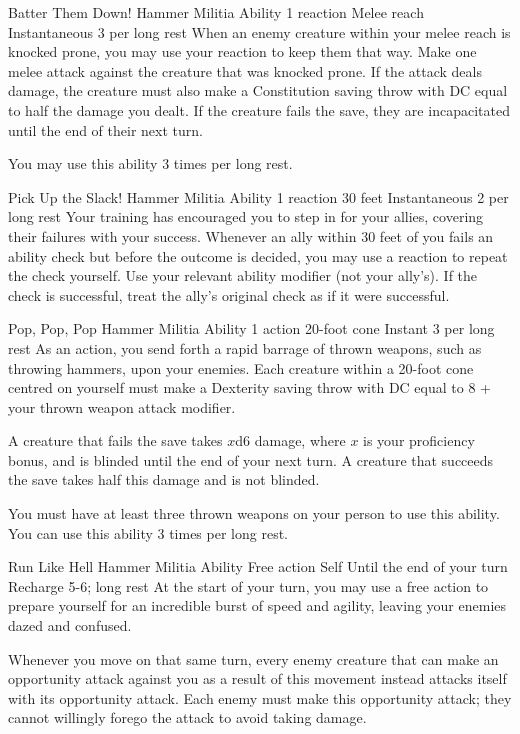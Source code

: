 \ability%
    {Batter Them Down!}
    {Hammer Militia Ability}
    {1 reaction}
    {Melee reach}
    {Instantaneous}
    {3 per long rest}
When an enemy creature within your melee reach is knocked prone,
you may use your reaction to keep them that way. 
Make one melee attack against the creature
that was knocked prone.
If the attack deals damage,
the creature must also make a Constitution saving throw
with DC equal to half the damage you dealt.
If the creature fails the save,
they are incapacitated until the end of their next turn.

You may use this ability 3 times per long rest.


\ability%
    {Pick Up the Slack!}
    {Hammer Militia Ability}
    {1 reaction}
    {30 feet}
    {Instantaneous}
    {2 per long rest}
Your training has encouraged you to step in for your allies,
covering their failures with your success.
Whenever an ally within 30 feet of you fails an ability check
but before the outcome is decided,
you may use a reaction to repeat the check yourself.
Use your relevant ability modifier (not your ally's).
If the check is successful,
treat the ally's original check as if it were successful.

\ability%
    {Pop, Pop, Pop}
    {Hammer Militia Ability}
    {1 action}
    {20-foot cone}
    {Instant}
    {3 per long rest}
As an action,
you send forth a rapid barrage of thrown weapons,
such as throwing hammers, upon your enemies.
Each creature within a 20-foot cone centred on yourself
must make a Dexterity saving throw with DC equal to
8 + your thrown weapon attack modifier.

A creature that fails the save takes $x$d6 damage,
where $x$ is your proficiency bonus, and is blinded
until the end of your next turn.
A creature that succeeds the save takes half this damage
and is not blinded.

You must have at least three thrown weapons on your person
to use this ability.
You can use this ability 3 times per long rest.


\ability%
    {Run Like Hell}
    {Hammer Militia Ability}
    {Free action}
    {Self}
    {Until the end of your turn}
    {Recharge 5-6; long rest}
At the start of your turn,
you may use a free action to prepare yourself
for an incredible burst of speed and agility,
leaving your enemies dazed and confused.

Whenever you move on that same turn,
every enemy creature that can make an opportunity attack
against you as a result of this movement
instead attacks itself with its opportunity attack.
Each enemy must make this opportunity attack;
they cannot willingly forego the attack to
avoid taking damage.

